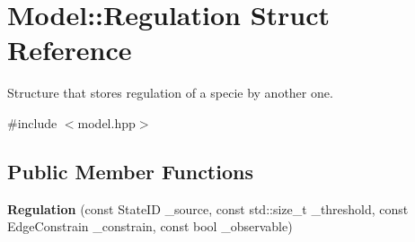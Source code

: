 \hypertarget{structModel_1_1Regulation}{\section{\-Model\-:\-:\-Regulation \-Struct \-Reference}
\label{structModel_1_1Regulation}
}


\-Structure that stores regulation of a specie by another one.  




{\ttfamily \#include $<$model.\-hpp$>$}

\subsection*{\-Public \-Member \-Functions}
\begin{DoxyCompactItemize}
\item 
\hypertarget{structModel_1_1Regulation_aee72782f3a75d10083c2771865a39c7b}{{\bfseries \-Regulation} (const \-State\-I\-D \-\_\-source, const std\-::size\-\_\-t \-\_\-threshold, const \-Edge\-Constrain \-\_\-constrain, const bool \-\_\-observable)}\label{structModel_1_1Regulation_aee72782f3a75d10083c2771865a39c7b}

\end{DoxyCompactItemize}
